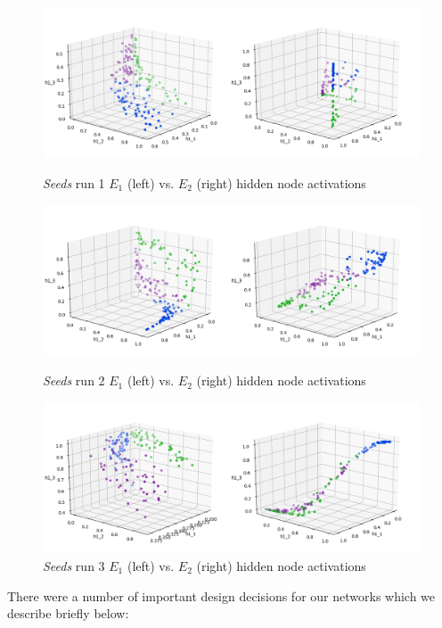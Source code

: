 \begin{figure}[t!]
  \includegraphics[width=\columnwidth]{4_h1_Seed_11_train_3d.png}
  \caption{\textit{Seeds} run 1 $E_1$ (left) vs. $E_2$ (right) hidden node activations}
    \label{fig:seeds_3d_1}
    \endminipage\hfill
{}
  \includegraphics[width=\columnwidth]{4_h1_Seed_18_train_3d.png}
  \caption{\textit{Seeds} run 2 $E_1$ (left) vs. $E_2$ (right) hidden node activations}
    \label{fig:seeds_3d_2}
\endminipage\hfill
{}
  \includegraphics[width=\columnwidth]{4_h1_Seed_3_train_3d.png}
  \caption{\textit{Seeds} run 3 $E_1$ (left) vs. $E_2$ (right) hidden node activations}
    \label{fig:seeds_3d_3}
\endminipage
\end{figure}

There were a number of important design decisions for our networks
which we describe briefly below:

